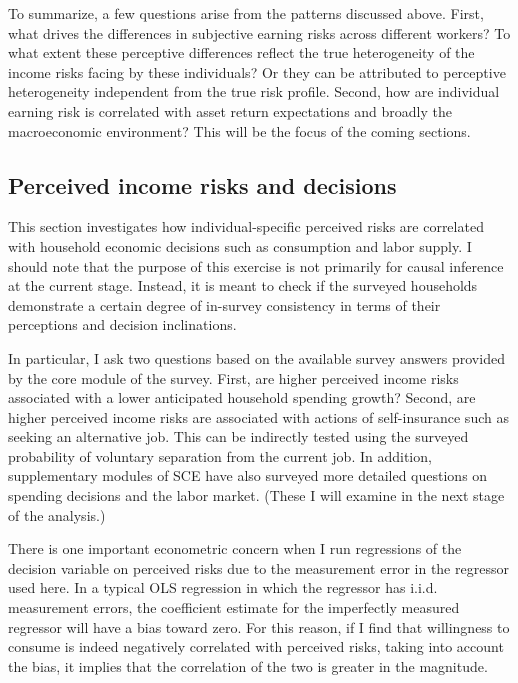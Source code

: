 \documentclass[12pt,notitlepage,onecolumn,aps,pra]{article}
\begin{document}
To summarize, a few questions arise from the patterns discussed above.
First, what drives the differences in subjective earning risks across
different workers? To what extent these perceptive differences reflect
the true heterogeneity of the income risks facing by these individuals?
Or they can be attributed to perceptive heterogeneity independent from
the true risk profile. Second, how are individual earning risk is
correlated with asset return expectations and broadly the macroeconomic
environment? This will be the focus of the coming sections.



    \hypertarget{perceived-income-risks-and-decisions}{%
\subsection{Perceived income risks and
decisions}\label{perceived-income-risks-and-decisions}}

This section investigates how individual-specific perceived risks are
correlated with household economic decisions such as consumption and
labor supply. I should note that the purpose of this exercise is not
primarily for causal inference at the current stage. Instead, it is
meant to check if the surveyed households demonstrate a certain degree
of in-survey consistency in terms of their perceptions and decision
inclinations.

In particular, I ask two questions based on the available survey answers
provided by the core module of the survey. First, are higher perceived
income risks associated with a lower anticipated household spending
growth? Second, are higher perceived income risks are associated with
actions of self-insurance such as seeking an alternative job. This can
be indirectly tested using the surveyed probability of voluntary
separation from the current job. In addition, supplementary modules of
SCE have also surveyed more detailed questions on spending decisions and
the labor market. (These I will examine in the next stage of the
analysis.)

There is one important econometric concern when I run regressions of the
decision variable on perceived risks due to the measurement error in the
regressor used here. In a typical OLS regression in which the regressor
has i.i.d. measurement errors, the coefficient estimate for the
imperfectly measured regressor will have a bias toward zero. For this
reason, if I find that willingness to consume is indeed negatively
correlated with perceived risks, taking into account the bias, it
implies that the correlation of the two is greater in the magnitude.
\end{document}
